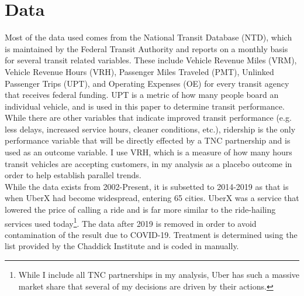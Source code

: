 \documentclass [12pt]{report}
\begin{document}
\section*{Data}
Most of the data used comes from the National Transit Database (NTD), which  is maintained by the Federal Transit Authority and reports on a monthly basis for several transit related variables. These include Vehicle Revenue Miles (VRM), Vehicle Revenue Hours (VRH), Passenger Miles Traveled (PMT), Unlinked Passenger Trips (UPT), and Operating Expenses (OE) for every transit agency that receives federal funding. UPT is a metric of how many people board an individual vehicle, and is used in this paper to determine transit performance. While there are other variables that indicate improved transit performance (e.g. less delays, increased service hours, cleaner conditions, etc.), ridership is the only performance variable that will be directly effected by a TNC partnership and is used as an outcome variable. I use VRH, which is a measure of how many hours transit vehicles are accepting customers, in my analysis as a placebo outcome in order to help establish parallel trends. \\
\indent While the data exists from 2002-Present, it is subsetted to 2014-2019 as that is when UberX had become widespread, entering 65 cities. UberX was a service that lowered the price of calling a ride and is far more similar to the ride-hailing services used today\footnote{While I include all TNC partnerships in my analysis, Uber has such a massive market share that several of my decisions are driven by their actions.}. The data after 2019 is removed in order to avoid contamination of the result due to COVID-19. Treatment is determined using the list provided by the Chaddick Institute \parencite{depaul} and is coded in manually.
\begin{table}[H] \centering \renewcommand*{\arraystretch}{1.1}\caption{Summary statistics for NTD data}
\end{table}
\end{document}
